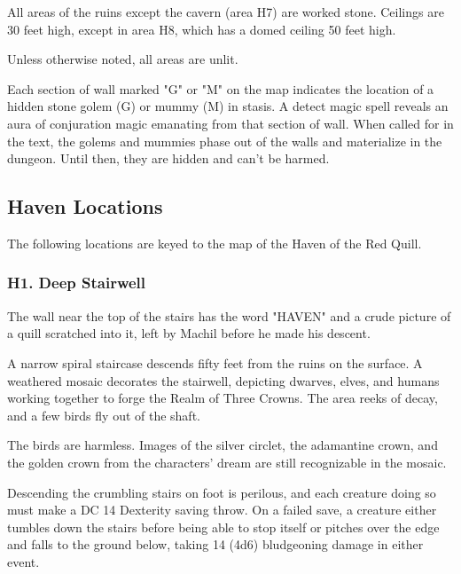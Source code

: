 \documentclass[10pt,a4paper,twoside,bg=print,twocolumn,openany,nodeprecatedcode]{dndbook}
\begin{document}
\begin{description}[nolistsep]
\item[Floors, Walls, and Ceilings]
All areas of the ruins except the cavern (area H7) are worked stone. Ceilings are 30 feet high, except in area H8, which has a domed ceiling 50 feet high.
\item[Light]
Unless otherwise noted, all areas are unlit.
\item[Golems and Mummies]
Each section of wall marked "G" or "M" on the map indicates the location of a hidden stone golem (G) or mummy (M) in stasis. A detect magic spell reveals an aura of conjuration magic emanating from that section of wall. When called for in the text, the golems and mummies phase out of the walls and materialize in the dungeon. Until then, they are hidden and can't be harmed.
\end{description}

\subsection{Haven Locations}
The following locations are keyed to the map of the Haven of the Red Quill.

\subsubsection{H1. Deep Stairwell}
The wall near the top of the stairs has the word "HAVEN" and a crude picture of a quill scratched into it, left by Machil before he made his descent.

\begin{DndReadAloud}{}
A narrow spiral staircase descends fifty feet from the ruins on the surface. A weathered mosaic decorates the stairwell, depicting dwarves, elves, and humans working together to forge the Realm of Three Crowns. The area reeks of decay, and a few birds fly out of the shaft.

\end{DndReadAloud}

The birds are harmless. Images of the silver circlet, the adamantine crown, and the golden crown from the characters' dream are still recognizable in the mosaic.

Descending the crumbling stairs on foot is perilous, and each creature doing so must make a DC 14 Dexterity saving throw. On a failed save, a creature either tumbles down the stairs before being able to stop itself or pitches over the edge and falls to the ground below, taking 14 (4d6) bludgeoning damage in either event.
\end{document}
